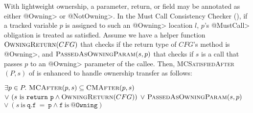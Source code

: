With lightweight ownership, a parameter, return, or field may be annotated
as either \<@Owning> or \<@NotOwning>.
In the Must Call Consistency Checker
(), if a tracked variable $p$ is assigned to such an
\<@Owning> location $l$, $p$'s
\<@MustCall> obligation is treated as satisfied. Assume we have a helper
function $\textsc{OwningReturn}(CFG)$ that checks if the return type of $CFG$'s
method is \<@Owning>, and $\textsc{PassedAsOwningParam}(s,p)$ that checks if $s$ is a
call that passes $p$ to an \<@Owning> parameter of the callee.  Then,
\textsc{MCSatisfiedAfter}$(P,s)$ of  is enhanced to handle
ownership transfer as follows:

\begin{algorithmic}
  \State \Return $\exists p \in P .\ \textsc{MCAfter}(p,s) \subseteq \textsc{CMAfter}(p,s)$ \newline
  \hspace*{6em} $\vee\ (s \mathrm{\ is\ } \mathtt{return\ p} \wedge \textsc{OwningReturn}(CFG))$ \newline
  \hspace*{6em} $\vee\ \textsc{PassedAsOwningParam}(s,p)$\newline
  \hspace*{6em} $\vee\ (s \mathrm{\ is\ } \mathtt{q.f\ =\ p} \wedge \mathtt{f} \mathrm{\ is\ } \mathtt{@Owning})$
  \EndProcedure

\end{algorithmic}

